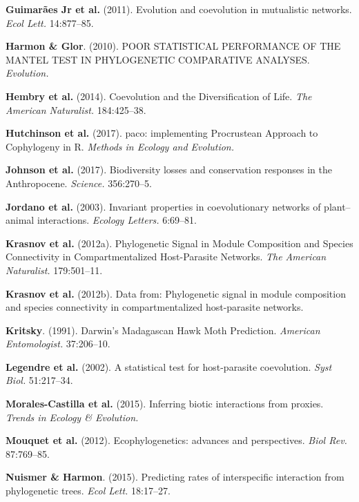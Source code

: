 \documentclass[12pt]{article}
\begin{document}
\hypertarget{ref-guim11ecm}{}
\textbf{Guimarães Jr et al.} (2011). Evolution and coevolution in
mutualistic networks. \emph{Ecol Lett.} 14:877--85.

\hypertarget{ref-harm10psp}{}
\textbf{Harmon \& Glor}. (2010). POOR STATISTICAL PERFORMANCE OF THE
MANTEL TEST IN PHYLOGENETIC COMPARATIVE ANALYSES. \emph{Evolution.}

\hypertarget{ref-hemb14cdl}{}
\textbf{Hembry et al.} (2014). Coevolution and the Diversification of
Life. \emph{The American Naturalist.} 184:425--38.

\hypertarget{ref-hutc17pip}{}
\textbf{Hutchinson et al.} (2017). paco: implementing Procrustean
Approach to Cophylogeny in R. \emph{Methods in Ecology and Evolution.}

\hypertarget{ref-john17blc}{}
\textbf{Johnson et al.} (2017). Biodiversity losses and conservation
responses in the Anthropocene. \emph{Science.} 356:270--5.

\hypertarget{ref-jord03ipc}{}
\textbf{Jordano et al.} (2003). Invariant properties in coevolutionary
networks of plant--animal interactions. \emph{Ecology Letters.}
6:69--81.

\hypertarget{ref-kras12psm}{}
\textbf{Krasnov et al.} (2012a). Phylogenetic Signal in Module
Composition and Species Connectivity in Compartmentalized Host-Parasite
Networks. \emph{The American Naturalist.} 179:501--11.

\hypertarget{ref-kras12dfp}{}
\textbf{Krasnov et al.} (2012b). Data from: Phylogenetic signal in
module composition and species connectivity in compartmentalized
host-parasite networks.

\hypertarget{ref-krit91dmh}{}
\textbf{Kritsky}. (1991). Darwin's Madagascan Hawk Moth Prediction.
\emph{American Entomologist.} 37:206--10.

\hypertarget{ref-lege02sth}{}
\textbf{Legendre et al.} (2002). A statistical test for host-parasite
coevolution. \emph{Syst Biol.} 51:217--34.

\hypertarget{ref-mora15ibi}{}
\textbf{Morales-Castilla et al.} (2015). Inferring biotic interactions
from proxies. \emph{Trends in Ecology \& Evolution.}

\hypertarget{ref-mouq12eap}{}
\textbf{Mouquet et al.} (2012). Ecophylogenetics: advances and
perspectives. \emph{Biol Rev.} 87:769--85.

\hypertarget{ref-nuis15pri}{}
\textbf{Nuismer \& Harmon}. (2015). Predicting rates of interspecific
interaction from phylogenetic trees. \emph{Ecol Lett.} 18:17--27.
\end{document}
